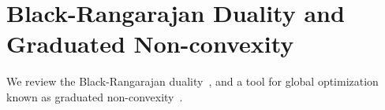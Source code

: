 
\section{Black-Rangarajan Duality and Graduated Non-convexity}

We review the Black-Rangarajan duality~\cite{Black96ijcv-unification}, and a tool for global optimization known as graduated non-convexity~\cite{Blake1987book-visualReconstruction}. 
